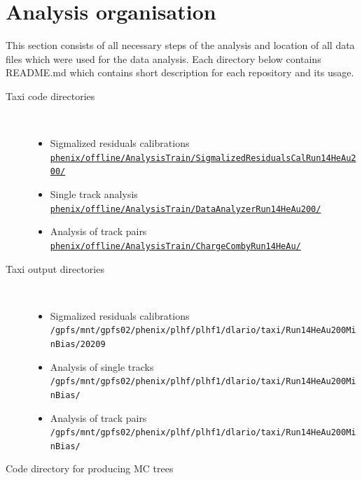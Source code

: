 \section{Analysis organisation}
	This section consists of all necessary steps of the analysis and location of all data files which were used for the data analysis. Each directory below contains README.md which contains short description for each repository and its usage.
	\begin{description}
		\item[Taxi code directories]~
			\begin{itemize}
            \item{Sigmalized residuals calibrations} \\
               \href{https://phenix-intra.sdcc.bnl.gov/viewvc/phenix/offline/AnalysisTrain/SigmalizedResidualsCalRun14HeAu200/}{\texttt{phenix/offline/AnalysisTrain/SigmalizedResidualsCalRun14HeAu200/}}
            \item{Single track analysis} \\
               \href{https://phenix-intra.sdcc.bnl.gov/viewvc/phenix/offline/AnalysisTrain/DataAnalyzerRun14HeAu200/}{\texttt{phenix/offline/AnalysisTrain/DataAnalyzerRun14HeAu200/}}
            \item{Analysis of track pairs} \\
               \href{https://phenix-intra.sdcc.bnl.gov/viewvc/phenix/offline/AnalysisTrain/ChargeCombyRun14HeAu200/}{\texttt{phenix/offline/AnalysisTrain/ChargeCombyRun14HeAu/}}
         \end{itemize}
      \item[Taxi output directories]~
         \begin{itemize}
            \item{Sigmalized residuals calibrations} \\
               \texttt{/gpfs/mnt/gpfs02/phenix/plhf/plhf1/dlario/taxi/Run14HeAu200MinBias/20209}
            \item{Analysis of single tracks} \\
               \texttt{/gpfs/mnt/gpfs02/phenix/plhf/plhf1/dlario/taxi/Run14HeAu200MinBias/\color{red}{??}}
            \item{Analysis of track pairs} \\
               \texttt{/gpfs/mnt/gpfs02/phenix/plhf/plhf1/dlario/taxi/Run14HeAu200MinBias/\color{red}{??}}
         \end{itemize}
      \item[Code directory for producing MC trees]~\\

\end{description}
